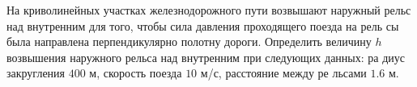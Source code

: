 На криволинейных участках железнодорожного пути возвышают наружный рельс 
над внутренним для того, чтобы сила давления проходящего поезда на рель
сы была направлена перпендикулярно полотну дороги. Определить величину
$h$ возвышения наружного рельса над внутренним при следующих данных: ра
диус закругления $400$ м, скорость поезда $10$ м/с, расстояние между ре
льсами $1.6$ м.
